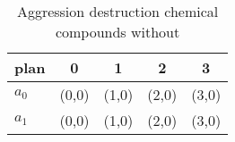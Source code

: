 \documentclass[a4paper]{article}
\begin{document}
\begin{table}
\begin{adjustbox}{width=0.7\columnwidth}
\begin{tabular}{|l|l|l|l|l|}
\hline
\textbf{plan} & \multicolumn{1}{c|}{\textbf{0}} & \multicolumn{1}{c|}{\textbf{1}} & \multicolumn{1}{c|}{\textbf{2}} & \multicolumn{1}{c|}{\textbf{3}} \\ \hline
\textbf{$a_0$}  & (0,0) & (1,0) & (2,0) & (3,0) \\ \hline
\textbf{$a_1$}  & (0,0) & (1,0) & (2,0) & (3,0) \\ \hline
\end{tabular}
\end{adjustbox}
\caption{Aggression destruction chemical compounds without
}
\end{table}
\end{document}
